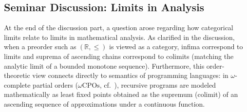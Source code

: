 \subsection{Seminar Discussion: Limits in Analysis}
At the end of the discussion part, a question arose regarding how categorical limits relate to limits in mathematical analysis. As clarified in the discussion, when a preorder such as $(\mathbb{R}, \le)$ is viewed as a category, infima correspond to limits and suprema of ascending chains correspond to colimits (matching the analytic limit of a bounded monotone sequence). Furthermore, this order-theoretic view connects directly to semantics of programming languages: in $\omega$-complete partial orders ($\omega\text{CPOs}$, cf.~\cite[Ex.~5.33]{Awodey10}), recursive programs are modeled mathematically as least fixed points obtained as the supremum (colimit) of an ascending sequence of approximations under a continuous function.

